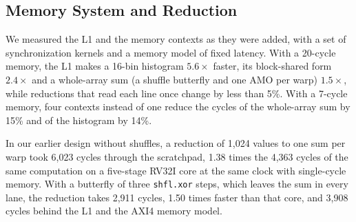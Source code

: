 \subsection{Memory System and Reduction}\label{sec:evalmem}
We measured the L1 and the memory contexts as they were added, with a set of
synchronization kernels and a memory model of fixed latency. With a 20-cycle
memory, the L1 makes a 16-bin histogram $5.6\times$ faster, its block-shared form
$2.4\times$ and a whole-array sum (a shuffle butterfly and one AMO per warp)
$1.5\times$, while reductions that read each line once change by less than 5\%.
With a 7-cycle memory, four contexts instead of one reduce the cycles of the
whole-array sum by 15\% and of the histogram by 14\%.

In our earlier design without shuffles, a reduction of 1,024 values to one sum
per warp took 6,023 cycles through the scratchpad, 1.38 times the 4,363 cycles of
the same computation on a five-stage RV32I core at the same clock with
single-cycle memory. With a butterfly of three \texttt{shfl.xor} steps, which
leaves the sum in every lane, the reduction takes 2,911 cycles, 1.50 times faster
than that core, and 3,908 cycles behind the L1 and the AXI4 memory model.

